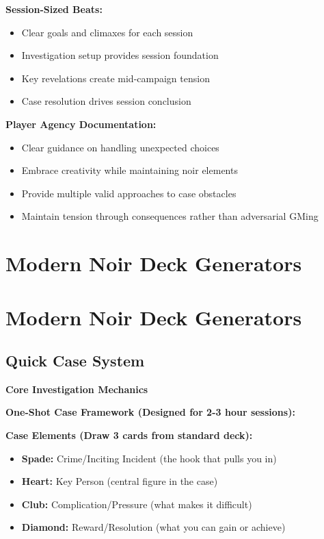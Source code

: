 \documentclass[11pt]{article}
\begin{document}
\textbf{Session-Sized Beats:}
\begin{itemize}
\item Clear goals and climaxes for each session
\item Investigation setup provides session foundation
\item Key revelations create mid-campaign tension
\item Case resolution drives session conclusion
\end{itemize}

\textbf{Player Agency Documentation:}
\begin{itemize}
\item Clear guidance on handling unexpected choices
\item Embrace creativity while maintaining noir elements
\item Provide multiple valid approaches to case obstacles
\item Maintain tension through consequences rather than adversarial GMing
\end{itemize}

\section{Modern Noir Deck Generators}



\section{Modern Noir Deck Generators}

\subsection{Quick Case System}

\textbf{Core Investigation Mechanics}

\textbf{One-Shot Case Framework (Designed for 2-3 hour sessions):}

\textbf{Case Elements (Draw 3 cards from standard deck):}
\begin{itemize}
    \item \textbf{Spade:} Crime/Inciting Incident (the hook that pulls you in)
    \item \textbf{Heart:} Key Person (central figure in the case)
    \item \textbf{Club:} Complication/Pressure (what makes it difficult)
    \item \textbf{Diamond:} Reward/Resolution (what you can gain or achieve)
\end{itemize}
\end{document}
